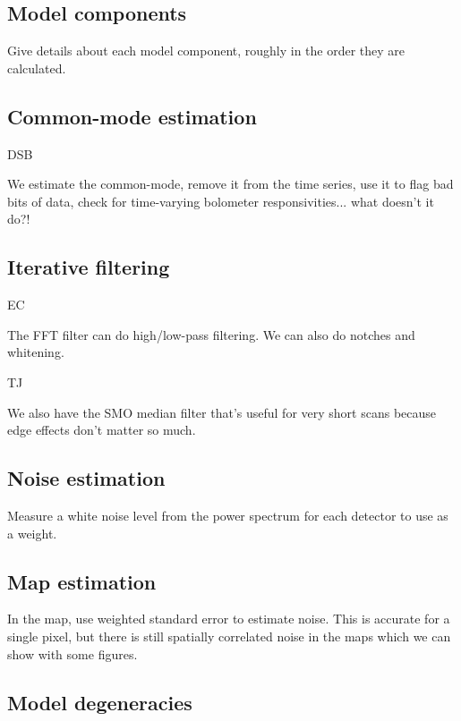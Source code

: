 \documentclass[useAMS,usenatbib,nofootinbib]{mn2e}
\begin{document}
\subsection{Model components}

Give details about each model component, roughly in the order they are
calculated.

\subsection{Common-mode estimation}

DSB

We estimate the common-mode, remove it from the time series, use it to
flag bad bits of data, check for time-varying bolometer
responsivities... what doesn't it do?!

\subsection{Iterative filtering}

EC

The FFT filter can do high/low-pass filtering. We can also do notches
and whitening.

TJ

We also have the SMO median filter that's useful for very short scans
because edge effects don't matter so much.


\subsection{Noise estimation}

Measure a white noise level from the power spectrum for each detector
to use as a weight.

\subsection{Map estimation}

In the map, use weighted standard error to estimate noise. This is
accurate for a single pixel, but there is still spatially correlated
noise in the maps which we can show with some figures.

\subsection{Model degeneracies}
\end{document}
